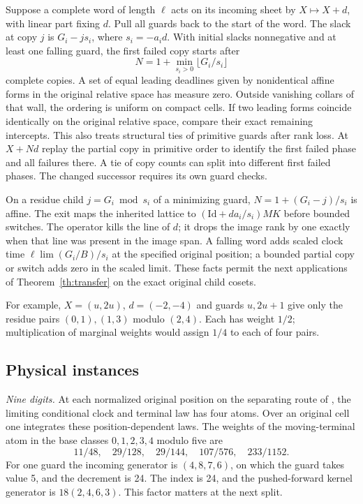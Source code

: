 \documentclass[11pt,reqno]{amsart}
\theoremstyle{definition}
\begin{document}
Suppose a complete word of length \(\ell\) acts on its incoming sheet by \(X\mapsto X+d\), with linear part fixing \(d\). Pull all guards back to the start of the word. The slack at copy \(j\) is \(G_i-js_i\), where \(s_i=-a_id\). With initial slacks nonnegative and at least one falling guard, the first failed copy starts after
\[
 N=1+\min_{s_i>0}\lfloor G_i/s_i\rfloor
\]
complete copies. A set of equal leading deadlines given by nonidentical affine forms in the original relative space has measure zero. Outside vanishing collars of that wall, the ordering is uniform on compact cells. If two leading forms coincide identically on the original relative space, compare their exact remaining intercepts. This also treats structural ties of primitive guards after rank loss. At \(X+Nd\) replay the partial copy in primitive order to identify the first failed phase and all failures there. A tie of copy counts can split into different first failed phases. The changed successor requires its own guard checks.

On a residue child \(j=G_i\bmod s_i\) of a minimizing guard, \(N=1+(G_i-j)/s_i\) is affine. The exit maps the inherited lattice to \((\mathrm{Id}+da_i/s_i)MK\) before bounded switches. The operator kills the line of \(d\); it drops the image rank by one exactly when that line was present in the image span. A falling word adds scaled clock time \(\ell\lim (G_i/B)/s_i\) at the specified original position; a bounded partial copy or switch adds zero in the scaled limit. These facts permit the next applications of Theorem~\ref{th:transfer} on the exact original child cosets.

For example, \(X=(u,2u)\), \(d=(-2,-4)\) and guards \(u,2u+1\) give only the residue pairs \((0,1),(1,3)\) modulo \((2,4)\). Each has weight \(1/2\); multiplication of marginal weights would assign \(1/4\) to each of four pairs.

\subsection{Physical instances}
\textit{Nine digits.} At each normalized original position on the separating route of \cite[Sections~4.2--4.4]{G4}, the limiting conditional clock and terminal law has four atoms. Over an original cell one integrates these position-dependent laws. The weights of the moving-terminal atom in the base classes \(0,1,2,3,4\) modulo five are
\[
 11/48,\quad29/128,\quad29/144,\quad107/576,\quad233/1152 .
\]
For one guard the incoming generator is \((4,8,7,6)\), on which the guard takes value 5, and the decrement is 24. The index is 24, and the pushed-forward kernel generator is \(18(2,4,6,3)\). This factor matters at the next split.
\end{document}

